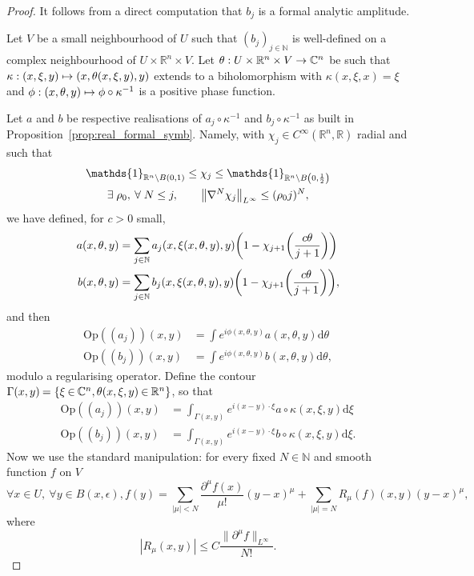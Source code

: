 \documentclass[10pt]{amsart}
\theoremstyle{definition}\newtheorem{defi}[theo]{Definition}\newtheorem{rema}[theo]{Remark}\newtheorem{exam}[theo]{Example}\newtheorem{exem}[theo]{Example}\newtheorem{nota}[theo]{Notation}
\newcommand{\Opp}{\mathrm{Op}}
\newcommand\1{\mathds{1}}
\newcommand{\R}{\mathbb{R}}
\newcommand{\C}{\mathbb{C}}
\newcommand{\N}{\mathbb{N}}
\newcommand{\dd}{\mathrm{d}}
\newcommand*{\mk}{\mkern -1mu}
\let\oldexists\exists
\renewcommand*{\exists}{\mathrel{\oldexists}}
\let\oldforall\forall
\renewcommand*{\forall}{\mathrel{\oldforall}}
\renewcommand*{\to}{\mathchoice{\longrightarrow}{\rightarrow}{\rightarrow}{\rightarrow}}
\let\oldmapsto\mapsto
\renewcommand*{\mapsto}{\mathchoice{\longmapsto}{\oldmapsto}{\oldmapsto}{\oldmapsto}}
\let\originalleft\left
\let\originalright\right
\renewcommand{\left}{\mathopen{}\mathclose\bgroup\originalleft}
\renewcommand{\right}{\aftergroup\egroup\originalright}
\begin{document}
\begin{proof}
It follows from a direct computation that $b_j$ is a formal analytic
amplitude.

Let $V$ be a small neighbourhood of $U$ such that $(b_j)_{j\in \N}$ is well-defined on a complex neighbourhood of $U\times \R^n\times V$. Let $\theta:U\times \R^n\times V\to \C^n$ be such that $\kappa:(x,\xi,y)\mapsto (x,\theta(x,\xi,y),y)$ extends to a biholomorphism with $\kappa(x,\xi,x)=\xi$ and $\phi:(x,\theta,y)\mapsto \phi\circ \kappa^{-1}$ is a positive phase function.

Let $a$ and $b$ be respective realisations of $a_j\circ \kappa^{-1}$ and $b_j\circ \kappa^{-1}$ as built in Proposition~\ref{prop:real_formal_symb}. Namely, with $\chi_j\in C^{\infty}(\R^n,\R)$ radial and such that
\begin{gather*}
\1_{\R^n\setminus B(0,1)}\leq \chi_j\leq \1_{\R^n\setminus B\left(0,\frac 12\right)}\\
\exists \rho_0,\:\forall N\leq j,\qquad
\left\|\nabla^N\chi_j\right\|_{L^{\infty}}\leq (\rho_0j)^N,
\end{gather*}
we have defined, for $c>0$ small,
\begin{align*}
a(x,\theta,y)&=\sum_{j\in
\N}a_j(x,\xi(x,\theta,y),y)\left(1-\chi_{j+1}\left(\frac{c\theta}{j+1}\right)\right)\\
b(x,\theta,y)&=\sum_{j\in
\N}b_j(x,\xi(x,\theta,y),y)\left(1-\chi_{j+1}\left(\frac{c\theta}{j+1}\right)\right),
\end{align*}
and then
\begin{align*}
\Opp((a_j))(x,y)&=\int e^{i\phi(x,\theta,y)}a(x,\theta,y)\dd \theta\\
\Opp((b_j))(x,y)&=\int e^{i\phi(x,\theta,y)}b(x,\theta,y)\dd \theta,
\end{align*}
modulo a regularising operator. Define the contour ${\Gamma(x,y)\mk=\{\xi\mk\in\mk \C^n, \theta(x,\xi,y)\mk\in \mk\R^n\}}$, so that
\begin{align*}
\Opp((a_j))(x,y)&=\int_{\Gamma(x,y)} e^{i(x-y)\cdot \xi}a\circ \kappa(x,\xi,y)\dd \xi\\
\Opp((b_j))(x,y)&=\int_{\Gamma(x,y)} e^{i(x-y)\cdot \xi}b\circ \kappa (x,\xi,y)\dd \xi.
\end{align*}
Now we use the standard manipulation: for every fixed $N\in \N$ and smooth function $f$ on $V$
\[
\forall x\in U, \:\forall y \in B(x,\epsilon), f(y)=\sum_{|\mu|< N}\frac{\partial^\mu f(x)}{\mu!}(y-x)^{\mu}+\sum_{|\mu|=N}R_\mu(f)(x,y)(y-x)^{\mu},
\]
where
\[
|R_\mu(x,y)|\leq C\frac{\|\partial^{\mu}f\|_{L^{\infty}}}{N!}.
\]
\end{proof}
\end{document}
